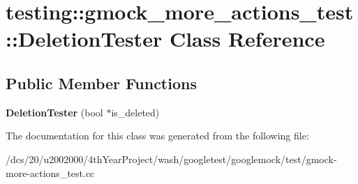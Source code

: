 \hypertarget{classtesting_1_1gmock__more__actions__test_1_1DeletionTester}{}\section{testing\+:\+:gmock\+\_\+more\+\_\+actions\+\_\+test\+:\+:Deletion\+Tester Class Reference}
\label{classtesting_1_1gmock__more__actions__test_1_1DeletionTester}
\subsection*{Public Member Functions}
\begin{DoxyCompactItemize}
\item 
\mbox{\label{classtesting_1_1gmock__more__actions__test_1_1DeletionTester_a3b9670fc6d29cb9d120fb0fdd2ba68d8}} 
{\bfseries Deletion\+Tester} (bool $\ast$is\+\_\+deleted)
\end{DoxyCompactItemize}


The documentation for this class was generated from the following file\+:\begin{DoxyCompactItemize}
\item 
/dcs/20/u2002000/4th\+Year\+Project/wash/googletest/googlemock/test/gmock-\/more-\/actions\+\_\+test.\+cc\end{DoxyCompactItemize}
